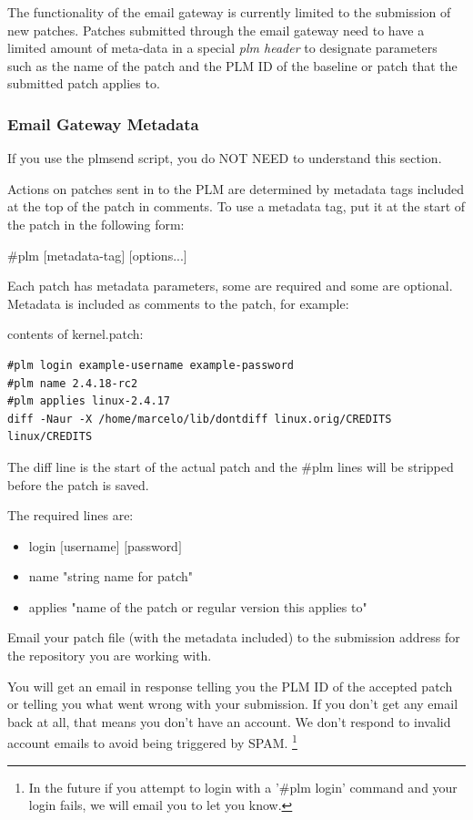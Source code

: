 The functionality of the email gateway is currently limited to the submission of
new patches.  Patches submitted through the email gateway need to have a limited
amount of meta-data in a special \emph{plm header} to designate parameters such
as the name of the patch and the PLM ID of the baseline or patch that the 
submitted patch applies to.

\subsubsection{Email Gateway Metadata}

If you use the plmsend script, you do NOT NEED to understand this section.

Actions on patches sent in to the PLM are determined by metadata tags included at
the top of the patch in comments. To use a metadata tag, put it at the start of
the patch in the following form: 
	
	\#plm $[$metadata-tag$]$ $[$options...$]$

Each patch has metadata parameters, some are required and some are optional.  
Metadata is included as comments to the patch, for example:

contents of kernel.patch:
\begin{verbatim}
#plm login example-username example-password 
#plm name 2.4.18-rc2 
#plm applies linux-2.4.17
diff -Naur -X /home/marcelo/lib/dontdiff linux.orig/CREDITS linux/CREDITS
\end{verbatim}

The diff line is the start of the actual patch and the \#plm lines will be 
stripped before the patch is saved.

The required lines are:
\begin{itemize}
\item login $[$username$]$ $[$password$]$
\item name "string name for patch"
\item applies "name of the patch or regular version this applies to"
\end{itemize}

Email your patch file (with the metadata included) to the submission address for
the repository you are working with.

You will get an email in response telling you the PLM ID of the accepted patch 
or telling you what went wrong with your submission.  If you don't get any 
email back at all, that means you don't have an account.  We don't respond to 
invalid account emails to avoid being triggered by SPAM.  \footnote{In the future if you 
attempt to login with a '\#plm login' command and your login fails, we will 
email you to let you know.}

